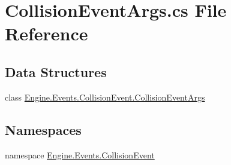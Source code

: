 \hypertarget{a00044}{}\section{Collision\+Event\+Args.\+cs File Reference}
\label{a00044}
\subsection*{Data Structures}
\begin{DoxyCompactItemize}
\item 
class \hyperlink{a00350}{Engine.\+Events.\+Collision\+Event.\+Collision\+Event\+Args}
\end{DoxyCompactItemize}
\subsection*{Namespaces}
\begin{DoxyCompactItemize}
\item 
namespace \hyperlink{a00245}{Engine.\+Events.\+Collision\+Event}
\end{DoxyCompactItemize}
